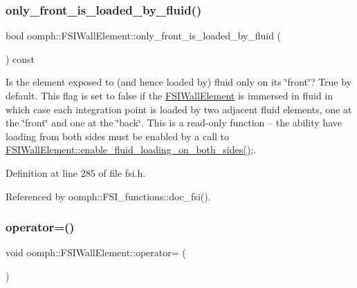 \subsubsection{\texorpdfstring{only\+\_\+front\+\_\+is\+\_\+loaded\+\_\+by\+\_\+fluid()}{only\_front\_is\_loaded\_by\_fluid()}}
{\footnotesize\ttfamily bool oomph\+::\+F\+S\+I\+Wall\+Element\+::only\+\_\+front\+\_\+is\+\_\+loaded\+\_\+by\+\_\+fluid (\begin{DoxyParamCaption}{ }\end{DoxyParamCaption}) const\hspace{0.3cm}{\ttfamily [inline]}}



Is the element exposed to (and hence loaded by) fluid only on its \char`\"{}front\char`\"{}? True by default. This flag is set to false if the \hyperlink{classoomph_1_1FSIWallElement}{F\+S\+I\+Wall\+Element} is immersed in fluid in which case each integration point is loaded by two adjacent fluid elements, one at the \char`\"{}front\char`\"{} and one at the \char`\"{}back\char`\"{}. This is a read-\/only function -- the ability have loading from both sides must be enabled by a call to \hyperlink{classoomph_1_1FSIWallElement_a0dc3efdeb5d0abf0ba473c0145652358}{F\+S\+I\+Wall\+Element\+::enable\+\_\+fluid\+\_\+loading\+\_\+on\+\_\+both\+\_\+sides()};. 



Definition at line 285 of file fsi.\+h.



Referenced by oomph\+::\+F\+S\+I\+\_\+functions\+::doc\+\_\+fsi().

\mbox{\label{classoomph_1_1FSIWallElement_afd5fb80cc019327172d9f6fee416c0b1}} 
\subsubsection{\texorpdfstring{operator=()}{operator=()}}
{\footnotesize\ttfamily void oomph\+::\+F\+S\+I\+Wall\+Element\+::operator= (\begin{DoxyParamCaption}\item[{const \hyperlink{classoomph_1_1FSIWallElement}{F\+S\+I\+Wall\+Element} \&}]{ }\end{DoxyParamCaption})\hspace{0.3cm}{\ttfamily [inline]}}



